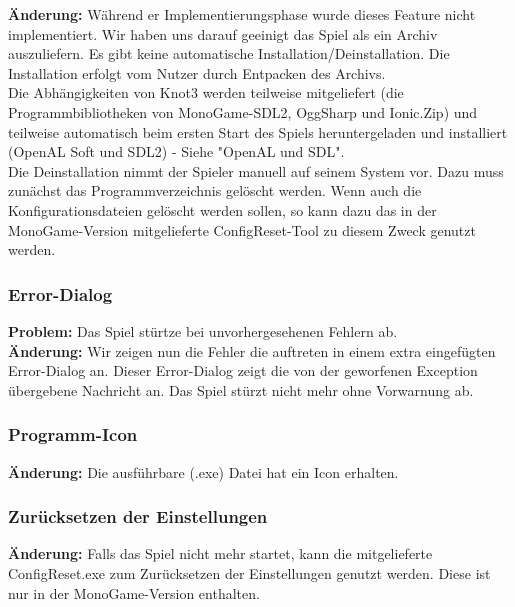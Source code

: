 \textbf{Änderung:} Während er Implementierungsphase wurde dieses Feature nicht implementiert.
Wir haben uns darauf geeinigt das Spiel als ein Archiv auszuliefern.
Es gibt keine automatische Installation/Deinstallation. Die Installation erfolgt vom Nutzer durch Entpacken des Archivs.\\

Die Abhängigkeiten von Knot3 werden teilweise mitgeliefert (die Programmbibliotheken von MonoGame-SDL2, OggSharp und Ionic.Zip) und teilweise automatisch beim ersten Start des Spiels heruntergeladen und installiert (OpenAL Soft und SDL2) - Siehe "OpenAL und SDL".\\

Die Deinstallation nimmt der Spieler manuell auf seinem System vor. Dazu muss zunächst das Programmverzeichnis gelöscht werden.
Wenn auch die Konfigurationsdateien gelöscht werden sollen, so kann dazu das in der MonoGame-Version mitgelieferte ConfigReset-Tool zu diesem Zweck genutzt werden.\\

\subsubsection*{Error-Dialog}
\textbf{Problem:} Das Spiel stürtze bei unvorhergesehenen Fehlern ab.\\

\textbf{Änderung:} Wir zeigen nun die Fehler die auftreten in einem extra eingefügten Error-Dialog an. Dieser Error-Dialog zeigt die von der geworfenen Exception übergebene Nachricht an. Das Spiel stürzt nicht mehr ohne Vorwarnung ab.\\

\subsubsection*{Programm-Icon}

\textbf{Änderung:} Die ausführbare (.exe) Datei hat ein Icon erhalten.\\

\subsubsection*{Zurücksetzen der Einstellungen}

\textbf{Änderung:} Falls das Spiel nicht mehr startet, kann die mitgelieferte ConfigReset.exe zum Zurücksetzen der Einstellungen genutzt werden.
Diese ist nur in der MonoGame-Version enthalten.\\
